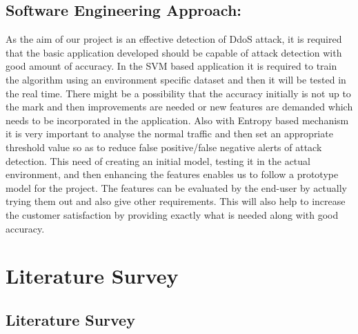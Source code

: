 \documentclass[12pt,a4paper,final]{report}
\begin{document}
\section{Software Engineering Approach:}
As the aim of our project is an effective detection of DdoS attack, it is required that the basic application developed should be capable of attack detection with good amount of accuracy. In the SVM based application it is required to train the algorithm using an environment specific dataset and then it will be tested in the real time. There might be a possibility that the accuracy initially is not up to the mark and then improvements are needed or new features are demanded which needs to be incorporated in the application. Also with Entropy based mechanism it is very important to analyse the normal traffic and then set an appropriate threshold value so as to reduce false positive/false negative alerts of attack detection. 
  This need of creating an initial model, testing it in the actual environment, and then enhancing the features enables us to follow a prototype model for the project. The features can be evaluated by the end-user by actually trying them out and also give other requirements. This will also help to increase the customer satisfaction by providing exactly what is needed along with good accuracy.
\newpage


\chapter{Literature Survey}
\thispagestyle{empty}
\newpage
\section{Literature Survey}
\end{document}
